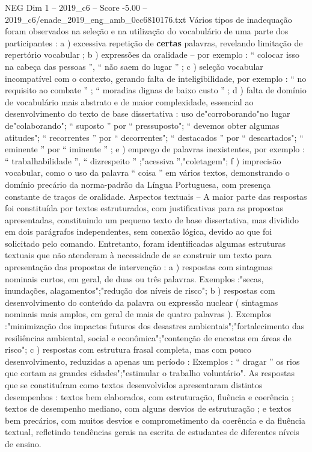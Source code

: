 \begin{textsample}{NEG Dim 1 – 2019\_c6 – Score -5.00 – 2019\_c6/enade\_2019\_eng\_amb\_0cc6810176.txt}
Vários tipos de inadequação foram observados na seleção e na utilização do vocabulário de uma parte dos participantes : a ) excessiva repetição de \textbf{certas} palavras, revelando limitação de repertório vocabular ; b ) expressões da oralidade – por exemplo : “ colocar isso na cabeça das pessoas ”, “ não saem do lugar ” ; c ) seleção vocabular incompatível com o contexto, gerando falta de inteligibilidade, por exemplo : “ no requisito ao combate ” ; “ moradias dignas de baixo custo ” ; d ) falta de domínio de vocabulário mais abstrato e de maior complexidade, essencial ao desenvolvimento do texto de base dissertativa : uso de"corroborando"no lugar de"colaborando"; “ suposto ” por “ pressuposto"; “ devemos obter algumas atitudes"; “ recorrentes ” por “ decorrentes"; “ destacados ” por “ descartados"; “ eminente ” por “ iminente ” ; e ) emprego de palavras inexistentes, por exemplo : “ trabalhabilidade ”, “ dizrespeito ” ;"acessiva ”,"coletagem"; f ) imprecisão vocabular, como o uso da palavra “ coisa ” em vários textos, demonstrando o domínio precário da norma-padrão da Língua Portuguesa, com presença constante de traços de oralidade.
Aspectos textuais – A maior parte das respostas foi constituída por textos estruturados, com justificativas para as propostas apresentadas, constituindo um pequeno texto de base dissertativa, mas dividido em dois parágrafos independentes, sem conexão lógica, devido ao que foi solicitado pelo comando.
Entretanto, foram identificadas algumas estruturas textuais que não atenderam à necessidade de se construir um texto para apresentação das propostas de intervenção : a ) respostas com sintagmas nominais curtos, em geral, de duas ou três palavras.
Exemplos :"secas, inundações, alagamentos";"redução dos níveis de risco"; b ) respostas com desenvolvimento do conteúdo da palavra ou expressão nuclear ( sintagmas nominais mais amplos, em geral de mais de quatro palavras ).
Exemplos :"minimização dos impactos futuros dos desastres ambientais";"fortalecimento das resiliências ambiental, social e econômica";"contenção de encostas em áreas de risco"; c ) respostas com estrutura frasal completa, mas com pouco desenvolvimento, reduzidas a apenas um período : Exemplos : “ dragar ” os rios que cortam as grandes cidades";"estimular o trabalho voluntário".
As respostas que se constituíram como textos desenvolvidos apresentaram distintos desempenhos : textos bem elaborados, com estruturação, fluência e coerência ; textos de desempenho mediano, com alguns desvios de estruturação ; e textos bem precários, com muitos desvios e comprometimento da coerência e da fluência textual, refletindo tendências gerais na escrita de estudantes de diferentes níveis de ensino.

\end{textsample}
